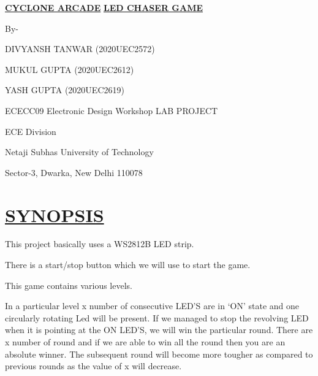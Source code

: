 \documentclass[12pt]{article}
\begin{document}
\begin{titlepage}
   \begin{center}
        \vspace*{0.25cm}

        \Huge\underline{\textbf{CYCLONE ARCADE}}
        \Huge\underline{\textbf{LED CHASER GAME}}

        \vspace{0.5cm}
            
        \vspace{3 cm}
       
        \vspace{0.25cm}
        \large{By-                    
        
        DIVYANSH TANWAR (2020UEC2572) 

MUKUL GUPTA (2020UEC2612) 

YASH GUPTA (2020UEC2619) }
       
        \vspace{3 cm}
        
        \vspace{0.25 cm}
        \Large{ECECC09 Electronic Design Workshop LAB PROJECT 

ECE Division 

Netaji Subhas University of Technology 

Sector-3, Dwarka, New Delhi 110078 }
       

       \vfill
    \end{center}
\end{titlepage}

\setcounter{page}{2}
\pagestyle{fancy}
\fancyhf{}
\rhead{\thepage}


\section*{\underline{SYNOPSIS}}

This project basically uses a WS2812B LED strip. 

There is a start/stop button which we will use to start the game.

This game contains various levels. 

In a particular level x number of consecutive LED’S are in ‘ON’ state and one circularly rotating Led will be present. If we managed to stop the revolving LED when it is pointing at the ON LED’S, we will win the particular round. There are x number of round and if we are able to win all the round then you are an absolute winner. The subsequent round will become more tougher as compared to previous rounds as the value of x will decrease. 
\end{document}
